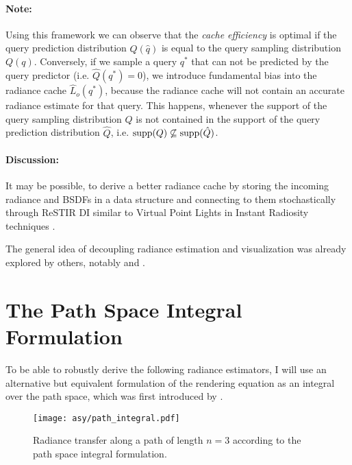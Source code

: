 \paragraph{Note:}
\label{par:cache_efficiency}
Using this framework we can observe that the \emph{cache efficiency} is optimal if the query prediction distribution $\hat{Q}(\hat{q})$ is equal to the query sampling distribution $Q(q)$.
Conversely, if we sample a query $q^*$ that can not be predicted by the query predictor (i.e. $\hat{Q}(q^*)=0$), we introduce fundamental bias into the radiance cache $\hat{L}_o(q^*)$, because the radiance cache will not contain an accurate radiance estimate for that query.
This happens, whenever the support of the query sampling distribution $Q$ is not contained in the support of the query prediction distribution $\hat{Q}$, i.e. $\operatorname{\mathrm{supp}}(Q) \not\subseteq \operatorname{\mathrm{supp}}(\hat{Q})$.

\paragraph{Discussion:} It may be possible, to derive a better radiance cache by storing the incoming radiance and BSDFs in a data structure and connecting to them stochastically through ReSTIR DI  similar to Virtual Point Lights in Instant Radiosity techniques .

The general idea of decoupling radiance estimation and visualization was already explored by others, notably \textcite{walter1999} and \textcite{tole2002}.

\section{The Path Space Integral Formulation}
\label{sec:path_space_integral}
To be able to robustly derive the following radiance estimators, I will use an alternative but equivalent formulation of the rendering equation as an integral over the path space, which was first introduced by \textcite{veach1997}.
\begin{figure}[ht]
    \centering
    \texttt{[image: asy/path\_integral.pdf]}
\caption{Radiance transfer along a path of length $n=3$ according to the path space integral formulation.}
\label{fig:path_space_integral}
\end{figure}

